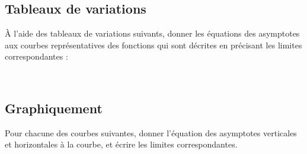 \documentclass[oneside,12pt]{article}          %
\begin{document}
\subsection{Tableaux de variations}
À l'aide des tableaux de variations suivants, donner les équations des asymptotes aux courbes représentatives des fonctions qui sont décrites en précisant les limites correspondantes :\\

\\





\subsection{Graphiquement}

Pour chacune des courbes suivantes, donner l'équation des asymptotes verticales et horizontales à la courbe, et écrire les limites correspondantes.
\end{document}
